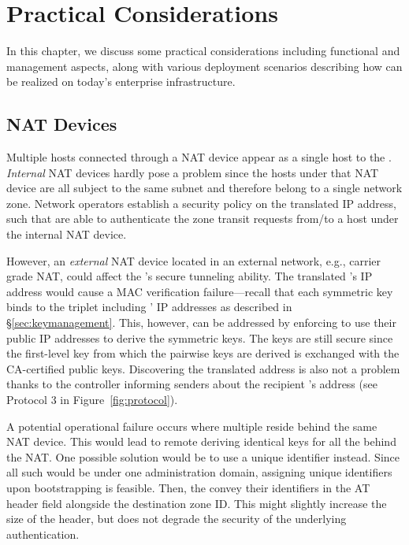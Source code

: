 \chapter{Practical Considerations}
\label{practical}

In this chapter, we discuss some practical considerations including functional and
management aspects, along with various deployment scenarios describing how \name can
be realized on today's enterprise infrastructure.


\section{NAT Devices}
\label{sec:nat}
Multiple hosts connected through a NAT device appear as a single host to the
\tp. \textit{Internal} NAT devices hardly pose a problem since the hosts under that NAT
device are all subject to the same subnet and therefore belong to a single network zone.
Network operators establish a security policy on the translated IP address, such
that \tps are able to authenticate the zone transit requests from/to a host under the
internal NAT device.

However, an \textit{external} NAT device located in an external network, e.g., carrier grade NAT,
could affect the \tp's secure tunneling ability. The translated \tp's IP address
would cause a MAC verification failure---recall that each symmetric key binds to the
triplet including \tps' IP addresses as described in \S\ref{sec:keymanagement}.
This, however, can be addressed by enforcing \tps to use their public IP addresses
to derive the symmetric keys. The keys are still secure since the first-level key
from which the pairwise keys are derived is exchanged with the CA-certified public
keys. Discovering the translated \tp address is also not a problem thanks to
the controller informing senders about the recipient \tp's address (see Protocol 3 in
Figure~\ref{fig:protocol}).

A potential operational failure occurs where multiple \tps reside behind the same NAT
device. This would lead to remote \tps deriving identical keys for all the \tps
behind the NAT. One possible solution would be to use a unique \tp identifier
instead. Since all such \tps would be under one administration domain, assigning
unique \tp identifiers upon bootstrapping is feasible. Then, the \tps convey
their identifiers in the AT header field alongside the destination zone ID. This
might slightly increase the size of the header, but does not degrade the
security of the underlying authentication.


